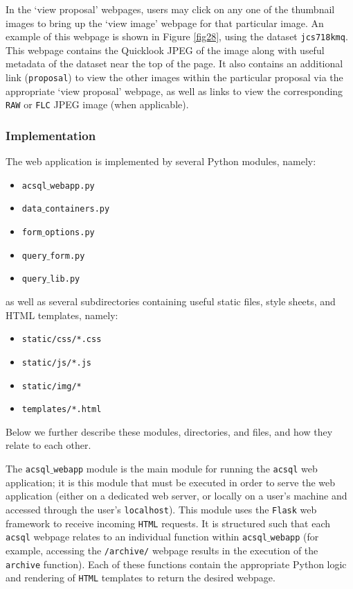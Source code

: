 \documentclass[10pt,journal,compsoc]{IEEEtran}
\begin{document}
In the `view proposal' webpages, users may click on any one of the thumbnail images to bring up the `view image' webpage for that particular image.  An example of this webpage is shown in
Figure \ref{fig28}, using the dataset \texttt{jcs718kmq}.  This webpage contains the Quicklook JPEG of the image along with useful metadata of the dataset near the top of the page.  It also
contains an additional link (\texttt{proposal}) to view the other images within the particular proposal via the appropriate `view proposal' webpage, as well as links to view the corresponding
\texttt{RAW} or \texttt{FLC} JPEG image (when applicable).


\subsubsection{Implementation}

The web application is implemented by several Python modules, namely:

\begin{itemize}
\item \texttt{acsql$\_$webapp.py}
\item \texttt{data$\_$containers.py}
\item \texttt{form$\_$options.py}
\item \texttt{query$\_$form.py}
\item \texttt{query$\_$lib.py}
\end{itemize}

as well as several subdirectories containing useful static files, style sheets, and HTML templates, namely:

\begin{itemize}
\item \texttt{static/css/*.css}
\item \texttt{static/js/*.js}
\item \texttt{static/img/*}
\item \texttt{templates/*.html}
\end{itemize}

Below we further describe these modules, directories, and files, and how they relate to each other.

The \texttt{acsql$\_$webapp} module is the main module for running the \texttt{acsql} web application; it is this module that must be executed in order to serve the web application
(either on a dedicated web server, or locally on a user's machine and accessed through the user's \texttt{localhost}).  This module uses the \texttt{Flask} web framework to receive
incoming \texttt{HTML} requests.  It is structured such that each \texttt{acsql} webpage relates to an individual function within \texttt{acsql$\_$webapp} (for example, accessing the
\texttt{/archive/} webpage results in the execution of the \texttt{archive} function). Each of these functions contain the appropriate Python logic and rendering of \texttt{HTML}
templates to return the desired webpage.
\end{document}
